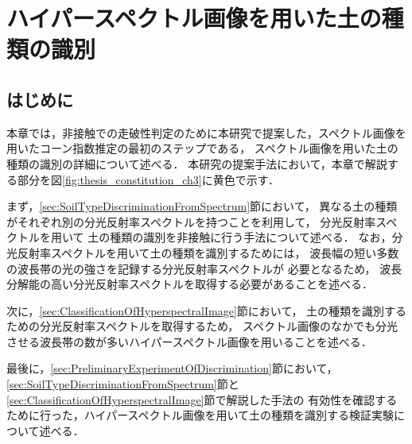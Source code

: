 \chapter{ハイパースペクトル画像を用いた土の種類の識別}
\thispagestyle{empty}
\label{ch:SoilTypeDiscrimination}
\minitoc

\newpage
\section{はじめに}
本章では，非接触での走破性判定のために本研究で提案した，スペクトル画像を用いたコーン指数推定の最初のステップである，
スペクトル画像を用いた土の種類の識別の詳細について述べる．
本研究の提案手法において，本章で解説する部分を図\ref{fig:thesis_constitution_ch3}に黄色で示す．


まず，\ref{sec:SoilTypeDiscriminationFromSpectrum}節において，
異なる土の種類がそれぞれ別の分光反射率スペクトルを持つことを利用して，
分光反射率スペクトルを用いて
土の種類の識別を非接触に行う手法について述べる．
なお，分光反射率スペクトルを用いて土の種類を識別するためには，
波長幅の短い多数の波長帯の光の強さを記録する分光反射率スペクトルが
必要となるため，
波長分解能の高い分光反射率スペクトルを取得する必要があることを述べる．

次に，\ref{sec:ClassificationOfHyperspectralImage}節において，
土の種類を識別するための分光反射率スペクトルを取得するため，
スペクトル画像のなかでも分光させる波長帯の数が多いハイパースペクトル画像を用いることを述べる．

最後に，\ref{sec:PreliminaryExperimentOfDiscrimination}節において，
\ref{sec:SoilTypeDiscriminationFromSpectrum}節と\ref{sec:ClassificationOfHyperspectralImage}節で解説した手法の
有効性を確認するために行った，ハイパースペクトル画像を用いて土の種類を識別する検証実験について述べる．

